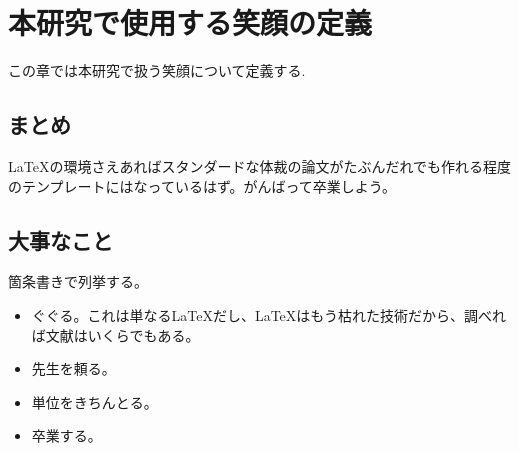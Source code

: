 \chapter{本研究で使用する笑顔の定義}
\label{chap:smile}

この章では本研究で扱う笑顔について定義する.

\section{まとめ}

\LaTeX の環境さえあればスタンダードな体裁の論文がたぶんだれでも作れる程度のテンプレートにはなっているはず。がんばって卒業しよう。


\section{大事なこと}

箇条書きで列挙する。

\begin{itemize}
 \item ぐぐる。これは単なる\LaTeX だし、\LaTeX はもう枯れた技術だから、調べれば文献はいくらでもある。
 \item 先生を頼る。
 \item 単位をきちんとる。
 \item 卒業する。
\end{itemize}
